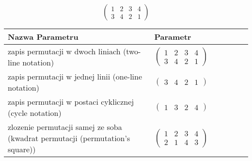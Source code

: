 \documentclass[12pt]{article}
\begin{document}
\subsection{}
\begin{center}
\[
\begin{pmatrix}
	1 & 2 & 3 & 4 \\ 
	3 & 4 & 2 & 1 
\end{pmatrix}
\]

\begin{tabular}{|m{0.6\linewidth}|m{0.4\linewidth}|}
	\hline
	Nazwa Parametru & Parametr \\
	\hline
	zapis permutacji w dwoch liniach (two-line notation) & $\begin{pmatrix} 1 & 2 & 3 & 4 \\ 
3 & 4 & 2 & 1 \end{pmatrix}$ \\ 
	\hline
	zapis permutacji w jednej linii (one-line notation) & $\begin{pmatrix} 3 & 4 & 2 & 1 \end{pmatrix}$ \\ 
	\hline
	zapis permutacji w postaci cyklicznej (cycle notation) & $\begin{pmatrix} 1 & 3 & 2 & 4 \end{pmatrix} $ \\ 
	\hline
	zlozenie permutacji samej ze soba (kwadrat permutacji (permutation's square)) & $\begin{pmatrix} 1 & 2 & 3 & 4 \\ 
2 & 1 & 4 & 3 \end{pmatrix}$ \\ 
	\hline
\end{tabular}
\end{center}
\end{document}

